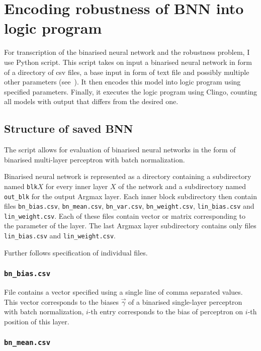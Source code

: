 \section{Encoding robustness of BNN into logic program}

For transcription of the binarised neural network and the robustness problem,
I use Python script. This script takes on input a binarised neural network in form of
a directory of csv files, a base input in form of text file and possibly multiple
other parameters (see~). It then encodes this model into
logic program using specified parameters. Finally, it executes the logic program
using Clingo, counting all models with output that differs from the desired one.

\subsection{Structure of saved BNN}

The script allows for evaluation of binarised neural networks in the form of
binarised multi-layer perceptron with batch normalization.

Binarised neural network is represented as a directory containing
a subdirectory named \texttt{blk$X$} for every inner layer $X$ of the network
and a subdirectory named \texttt{out\_blk} for the output Argmax layer.
Each inner block subdirectory then contain files \texttt{bn\_bias.csv},
\texttt{bn\_mean.csv}, \texttt{bn\_var.csv}, \texttt{bn\_weight.csv},
\texttt{lin\_bias.csv} and \texttt{lin\_weight.csv}. Each of these files contain
vector or matrix corresponding to the parameter of the layer.
The last Argmax layer subdirectory contains only files \texttt{lin\_bias.csv}
and \texttt{lin\_weight.csv}.

Further follows specification of individual files.

\subsubsection{\texttt{bn\_bias.csv}}

File contains a vector specified using a single line of comma separated values.
This vector corresponds to the biases $\vec \gamma$ of a binarised single-layer
perceptron with batch normalization, $i$-th entry corresponds to the bias of perceptron on
$i$-th position of this layer.

\subsubsection{\texttt{bn\_mean.csv}}

